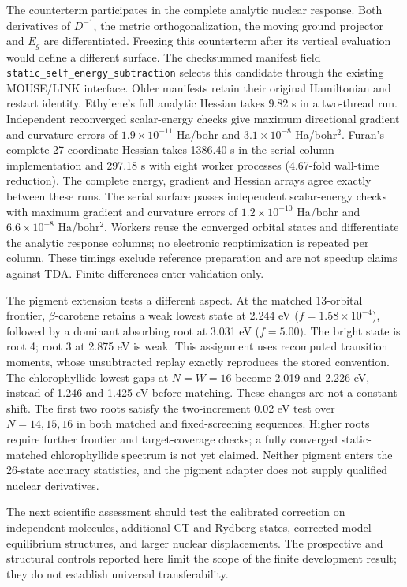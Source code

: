\documentclass[11pt,a4paper]{article}
\begin{document}
The counterterm participates in the complete analytic nuclear response.
Both derivatives of $D^{-1}$, the metric orthogonalization, the moving
ground projector and $E_g$ are differentiated. Freezing this counterterm
after its vertical evaluation would define a different surface.
The checksummed manifest field
\texttt{static\_self\_energy\_subtraction} selects this candidate through
the existing MOUSE/LINK interface. Older manifests retain their original
Hamiltonian and restart identity. Ethylene's full analytic Hessian takes
9.82 s in a two-thread run. Independent reconverged scalar-energy checks
give maximum directional gradient and curvature errors of
$1.9\times10^{-11}$ Ha/bohr and $3.1\times10^{-8}$ Ha/bohr$^2$.
Furan's complete 27-coordinate Hessian takes 1386.40 s in the serial
column implementation and 297.18 s with eight worker processes (4.67-fold
wall-time reduction). The complete energy, gradient and Hessian arrays
agree exactly between these runs. The serial surface passes independent
scalar-energy checks with maximum gradient and curvature errors of
$1.2\times10^{-10}$ Ha/bohr and $6.6\times10^{-8}$ Ha/bohr$^2$.
Workers reuse the converged orbital states and differentiate the analytic
response columns; no electronic reoptimization is repeated per column.
These timings exclude reference preparation and are not speedup claims
against TDA. Finite differences enter validation only.

The pigment extension tests a different aspect. At the matched
13-orbital frontier, $\beta$-carotene retains a weak lowest state at
2.244 eV ($f=1.58\times10^{-4}$), followed by a dominant absorbing
root at 3.031 eV ($f=5.00$). The bright state is root 4; root 3 at
2.875 eV is weak. This assignment uses recomputed transition moments,
whose unsubtracted replay exactly reproduces the stored convention.
The chlorophyllide lowest gaps at $N=W=16$ become 2.019 and 2.226 eV,
instead of 1.246 and 1.425 eV before matching. These changes are not
a constant shift. The first two roots satisfy the two-increment 0.02 eV
test over $N=14,15,16$ in both matched and fixed-screening sequences.
Higher roots require further frontier and target-coverage checks; a fully
converged static-matched chlorophyllide spectrum is not yet claimed.
Neither pigment enters the 26-state accuracy statistics, and the pigment
adapter does not supply qualified nuclear derivatives.


The next scientific assessment should test the calibrated correction on
independent molecules, additional CT and Rydberg states, corrected-model
equilibrium structures, and larger nuclear displacements.
The prospective and structural controls reported here limit the scope of
the finite development result; they do not establish universal transferability.
\end{document}
